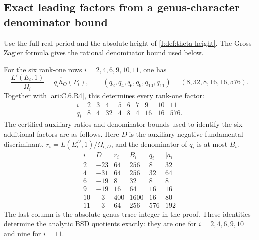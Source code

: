 \subsection{Exact leading factors from a genus-character denominator bound}

Use the full real period and the absolute height of
\cref{I:def:theta-height}. The Gross--Zagier formula gives the
rational denominator bound used below.

\begin{proposition}\hypertarget{tag-0014}{}\label{ari:C.6.R5}

For the six rank-one rows $i=2,4,6,9,10,11$, one has
\[
 \frac{L'(E_i,1)}{\Omega_i}
   =q_i\widehat h_O(P_i),\qquad
 (q_2,q_4,q_6,q_9,q_{10},q_{11})=(8,32,8,16,16,576).
\]
Together with \ref{ari:C.6.R4}, this determines every rank-one factor:
\[
\begin{array}{c|rrrrrrrrr}
 i&2&3&4&5&6&7&9&10&11\\\hline
 q_i&8&4&32&4&8&4&16&16&576.
\end{array}
\]
The certified auxiliary ratios and denominator bounds used to identify
the six additional factors are as follows. Here $D$ is the auxiliary
negative fundamental discriminant,
$r_i=L(E_i^D,1)/\Omega_{i,D}$, and the denominator of $q_i$ is at most
$B_i$.
\[
\begin{array}{c|r|r|r|r|r}
 i&D&r_i&B_i&q_i&|a_i|\\\hline
 2&-23&64&256&8&32\\
 4&-31&64&256&32&64\\
 6&-19&8&32&8&8\\
 9&-19&16&64&16&16\\
 10&-3&400&1600&16&80\\
 11&-3&64&256&576&192
\end{array}
\]
The last column is the absolute genus-trace integer in the proof. These
identities determine the analytic BSD quotients exactly: they are one
for $i=2,4,6,9,10$ and nine for $i=11$.
\end{proposition}



